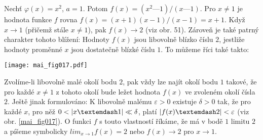 \wikitextrule
\begin{example}\label{MAI:exam028}
  Nechť \(\varphi(x) = x^2\), \(a = 1\). Potom \(f(x) = (x^2 — 1 )/(x — 1)\). Pro \(x \neq 1\) je 
  hodnota funkce \(f\) rovna \(f(x) = (x + 1) (x - 1 )/(x - 1) = x + 1\). Když \(x \rightarrow 1\) 
  (přičemž stále \(x \neq 1\)), pak \(f(x) \rightarrow 2\) (viz obr. 51). Zároveň je také patrný 
  charakter tohoto blížení: Hodnoty \(f(x)\) jsou libovolně blízko číslu \(2\), jestliže hodnoty 
  proměnné \(x\) jsou dostatečně blízké číslu \(1\). To můžeme říci také takto: 
  
  {\centering
   \captionsetup{type=figure}
%   
    \texttt{[image: mai\_fig017.pdf]}
  \par}
  
  Zvolíme-li libovolně malé okolí bodu \(2\), pak vždy lze najít okolí bodu \(1\) takové, že pro 
  každé \(x \neq 1\) z tohoto okolí bude ležet hodnota \(f(x)\) ve zvoleném okolí čísla \(2\). 
  Ještě jinak formulováno: K libovolně malému \(\varepsilon > 0\) existuje \(\delta > 0\) tak, 
  že pro každé \(x\), pro něž \(0 < \abs{x — 1} \ll \delta\), platí \(\abs{f(x) — 2} < 
  \varepsilon\) (viz obr. \ref{mai_fig017}). O funkci \(f\) s touto vlastností říkáme, že má v bodě 
  \(1\) limitu \(2\) a píšeme symbolicky \(lim_{x \to 1}f(x) = 2\) nebo \(f(x) \rightarrow 2\) pro 
  \(x \rightarrow 1\).
\end{example}















